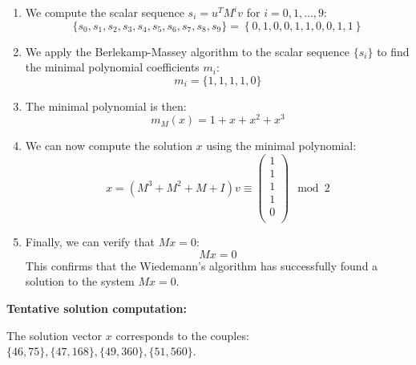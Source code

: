\documentclass[a4paper, 11pt]{article}
\begin{document}
\begin{enumerate}
    \item We compute the scalar sequence $s_i = u^T M^i v$ for $i=0,1,\dots,9$:
    \begin{equation}
        \{s_0, s_1, s_2, s_3, s_4, s_5, s_6, s_7, s_8, s_9\} 
        = 
        \left\{0,1,0,0,1,1,0,0,1,1\right\}
    \end{equation}
    \item We apply the Berlekamp-Massey algorithm to the scalar sequence $\{s_i\}$ to find the minimal polynomial coefficients $m_i$:
    \begin{equation}
        m_i = \{1, 1, 1, 1, 0\}
    \end{equation}
    \item The minimal polynomial is then:
    \begin{equation}
        m_M(x) = 1 + x + x^2 + x^3
    \end{equation}
    \item We can now compute the solution $x$ using the minimal polynomial:
    \begin{equation}
        x = (M^3 + M^2 + M + I)v
        \equiv \begin{pmatrix}
            1 \\
            1 \\
            1 \\
            1 \\
            0 \\
        \end{pmatrix} \mod 2
    \end{equation}
    \item Finally, we can verify that $Mx = 0$:
    \begin{equation}
        Mx = 0
    \end{equation}
    This confirms that the Wiedemann's algorithm has successfully found a solution to the system $Mx = 0$.
\end{enumerate}

\textbf{Tentative solution computation:}

The solution vector $x$ corresponds to the couples: $\{46,75\}, \{47,168\}, \{49,360\}, \{51,560\}$.
\end{document}
